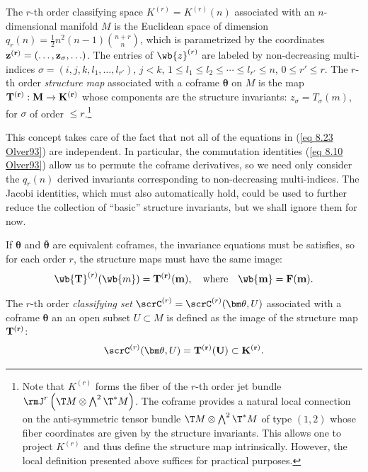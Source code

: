 \begin{defn}
    The $r$-th order classifying space $K^{(r)}=K^{(r)}(n)$ associated with an $n$-dimensional manifold $M$ is the Euclidean space of dimension $q_r(n)=\frac12 n^2(n-1)\binom{n+r}{n}$, which is parametrized by the coordinates $\bf{z}^{(r)}=(\ldots,z_\sigma,\ldots )$. The entries of $\wb{z}^{(r)}$ are labeled by non-decreasing multi-indices $\sigma=(i,j,k,l_1,\ldots,l_{r'})$, $j<k$, $1\leq l_1\leq l_2\leq \cdots \leq l_{r'}\leq n$, $0\leq r'\leq r$. The $r$-th order \emph{structure map} associated with a coframe $\bm\theta$ on $M$ is the map $\bf{T}^{(r)}:M\to K^{(r)}$ whose components are the structure invariants: $z_\sigma=T_\sigma(m)$, for $\sigma$ of order $\leq r$.\footnote{Note that $K^{(r)}$ forms the fiber of the $r$-th order jet bundle $\rmJ^r\left(\T M\otimes \bigwedge^2 \T^\ast M\right)$. The coframe provides a natural local connection on the anti-symmetric tensor bundle $\T M\otimes \bigwedge^2 \T^\ast M$ of type $(1,2)$ whose fiber coordinates are given by the structure invariants. This allows one to project $K^{(r)}$ and thus define the structure map intrinsically. However, the local definition presented above suffices for practical purposes.}
\end{defn}

This concept takes care of the fact that not all of the equations in (\ref{eq 8.23 Olver93}) are independent. In particular, the commutation identities (\ref{eq 8.10 Olver93}) allow us to permute the coframe derivatives, so we need only consider the $q_r(n)$ derived invariants corresponding to non-decreasing multi-indices. The Jacobi identities, which must also automatically hold, could be used to further reduce the collection of ``basic'' structure invariants, but we shall ignore them for now.

If $\bm\theta$ and $\bar{\bm\theta}$ are equivalent coframes, the invariance equations must be satisfies, so for each order $r$, the structure maps must have the same image:
\[\wb{\bf{T}}^{(r)}(\wb{m})=\bf{T}^{(r)}(m),\quad\text{where}\quad \wb{m}=F(m).\]

\begin{defn}
    The $r$-th order \emph{classifying set} $\scrC^{(r)}=\scrC^{(r)}(\bm\theta,U)$ associated with a coframe $\bm\theta$ an an open subset $U\subset M$ is defined as the image of the structure map $\bf{T}^{(r)}$:
    \[\scrC^{(r)}(\bm\theta,U)=\bf{T}^{(r)}(U)\subset K^{(r)}.\]
\end{defn}

